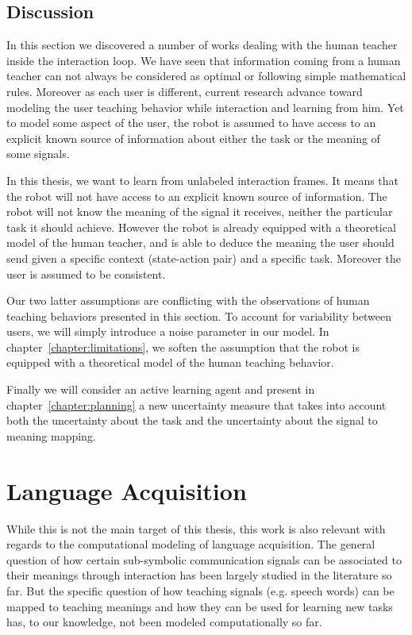 \subsection{Discussion}

In this section we discovered a number of works dealing with the human teacher inside the interaction loop. We have seen that information coming from a human teacher can not always be considered as optimal or following simple mathematical rules. Moreover as each user is different, current research advance toward modeling the user teaching behavior while interaction and learning from him. Yet to model some aspect of the user, the robot is assumed to have access to an explicit known source of information about either the task or the meaning of some signals.

In this thesis, we want to learn from unlabeled interaction frames. It means that the robot will not have access to an explicit known source of information. The robot will not know the meaning of the signal it receives, neither the particular task it should achieve. However the robot is already equipped with a theoretical model of the human teacher, and is able to deduce the meaning the user should send given a specific context (state-action pair) and a specific task. Moreover the user is assumed to be consistent.

Our two latter assumptions are conflicting with the observations of human teaching behaviors presented in this section. To account for variability between users, we will simply introduce a noise parameter in our model. In chapter~\ref{chapter:limitations}, we soften the assumption that the robot is equipped with a theoretical model of the human teaching behavior.

Finally we will consider an active learning agent and present in chapter~\ref{chapter:planning} a new uncertainty measure that takes into account both the uncertainty about the task and the uncertainty about the signal to meaning mapping.

\section{Language Acquisition}
\label{chapter:related:language}

While this is not the main target of this thesis, this work is also relevant with regards to the computational modeling of language acquisition. The general question of how certain sub-symbolic communication signals can be associated to their meanings through interaction has been largely studied in the literature so far. But the specific question of how teaching signals (e.g. speech words) can be mapped to teaching meanings and how they can be used for learning new tasks has, to our knowledge, not been modeled computationally so far. 

